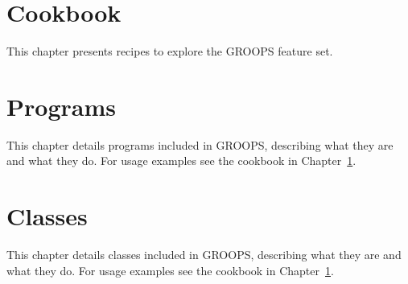 \documentclass[10pt,twoside,titlepage]{report}
\begin{document}
\chapter{Cookbook}\label{general.cookbook}
This chapter presents recipes to explore the GROOPS feature set.

\clearpage

\clearpage

\clearpage

\clearpage

\clearpage

\clearpage


\chapter{Programs}\label{programType}
This chapter details programs included in GROOPS, describing what they are and what they do. For usage examples see the cookbook in Chapter~\ref{general.cookbook}.


\chapter{Classes}\label{classes}
This chapter details classes included in GROOPS, describing what they are and what they do. For usage examples see the cookbook in Chapter~\ref{general.cookbook}.

\end{document}
